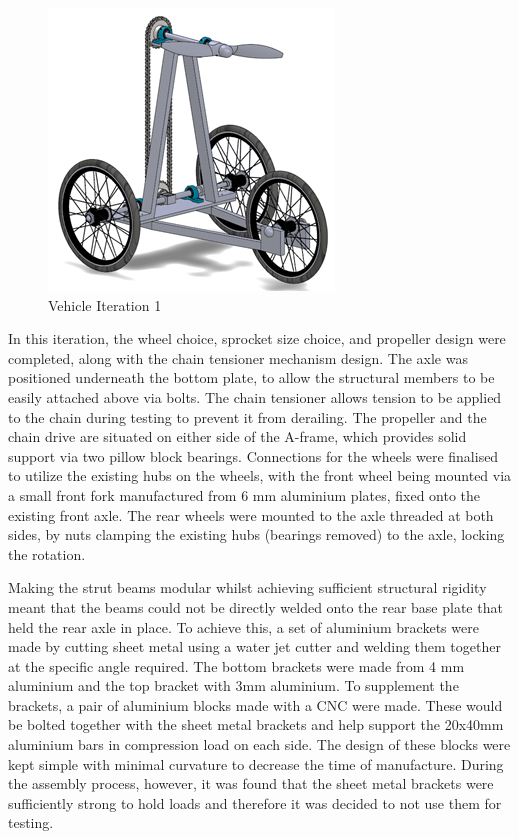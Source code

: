 
\begin{figure}[!htbp]
    \centering
    \includegraphics{images/part9/drivetrainIter1.png}
    \caption{Vehicle Iteration 1}
    \label{fig:dtIter1}
\end{figure}

In this iteration, the wheel choice, sprocket size choice, and propeller design were completed, along with the chain tensioner mechanism design. The axle was positioned underneath the bottom plate, to allow the structural members to be easily attached above via bolts. The chain tensioner allows tension to be applied to the chain during testing to prevent it from derailing. The propeller and the chain drive are situated on either side of the A-frame, which provides solid support via two pillow block bearings. Connections for the wheels were finalised to utilize the existing hubs on the wheels, with the front wheel being mounted via a small front fork manufactured from 6 mm aluminium plates, fixed onto the existing front axle. The rear wheels were mounted to the axle threaded at both sides, by nuts clamping the existing hubs (bearings removed) to the axle, locking the rotation.

Making the strut beams modular whilst achieving sufficient structural rigidity meant that the beams could not be directly welded onto the rear base plate that held the rear axle in place. To achieve this, a set of aluminium brackets were made by cutting sheet metal using a water jet cutter and welding them together at the specific angle required. The bottom brackets were made from 4 mm aluminium and the top bracket with 3mm aluminium. To supplement the brackets, a pair of aluminium blocks made with a CNC were made. These would be bolted together with the sheet metal brackets and help support the 20x40mm aluminium bars in compression load on each side. The design of these blocks were kept simple with minimal curvature to decrease the time of manufacture. During the assembly process, however, it was found that the sheet metal brackets were sufficiently strong to hold loads and therefore it was decided to not use them for testing.

